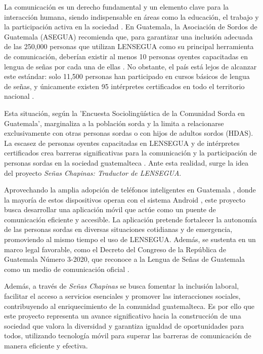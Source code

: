 La comunicación es un derecho fundamental y un elemento clave para la interacción humana, siendo indispensable en áreas como la educación, el trabajo y la participación activa en la sociedad \cite{NacionesUnidas2024}. En Guatemala, la Asociación de Sordos de Guatemala (ASEGUA) recomienda que, para garantizar una inclusión adecuada de las 250,000 personas que utilizan LENSEGUA como su principal herramienta de comunicación, deberían existir al menos 10 personas oyentes capacitadas en lengua de señas por cada una de ellas \cite{Conadi2021}. No obstante, el país está lejos de alcanzar este estándar: solo 11,500 personas han participado en cursos básicos de lengua de señas, y únicamente existen 95 intérpretes certificados en todo el territorio nacional \cite{three}.

Esta situación, según la 'Encuesta Sociolingüística de la Comunidad Sorda en Guatemala', marginaliza a la población sorda y la limita a relacionarse exclusivamente con otras personas sordas o con hijos de adultos sordos (HDAS). La escasez de personas oyentes capacitadas en LENSEGUA y de intérpretes certificados crea barreras significativas para la comunicación y la participación de personas sordas en la sociedad guatemalteca \cite{four}. Ante esta realidad, surge la idea del proyecto \textit{Señas Chapinas: Traductor de LENSEGUA}.

Aprovechando la amplia adopción de teléfonos inteligentes en Guatemala \cite{Xie2023}, donde la mayoría de estos dispositivos operan con el sistema Android \cite{Xie2023}, este proyecto busca desarrollar una aplicación móvil que actúe como un puente de comunicación eficiente y accesible. La aplicación pretende fortalecer la autonomía de las personas sordas en diversas situaciones cotidianas y de emergencia, promoviendo al mismo tiempo el uso de LENSEGUA. Además, se sustenta en un marco legal favorable, como el Decreto del Congreso de la República de Guatemala Número 3-2020, que reconoce a la Lengua de Señas de Guatemala como un medio de comunicación oficial \cite{CongresoGuatemala2022}.

Además, a través de \textit{Señas Chapinas} se busca fomentar la inclusión laboral, facilitar el acceso a servicios esenciales y promover las interacciones sociales, contribuyendo al enriquecimiento de la comunidad guatemalteca. Es por ello que este proyecto representa un avance significativo hacia la construcción de una sociedad que valora la diversidad y garantiza igualdad de oportunidades para todos, utilizando tecnología móvil para superar las barreras de comunicación de manera eficiente y efectiva.




